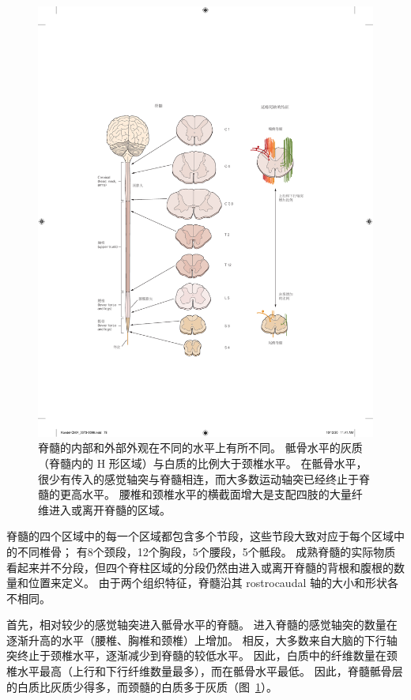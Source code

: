 \begin{figure}[htbp]
	\centering
	\includegraphics[width=1.0\linewidth]{chap04/fig_4_4}
	\caption{脊髓的内部和外部外观在不同的水平上有所不同。 
		骶骨水平的灰质（脊髓内的 H 形区域）与白质的比例大于颈椎水平。 
		在骶骨水平，很少有传入的感觉轴突与脊髓相连，而大多数运动轴突已经终止于脊髓的更高水平。 
		腰椎和颈椎水平的横截面增大是支配四肢的大量纤维进入或离开脊髓的区域。}
	\label{fig:4_4}
\end{figure}


脊髓的四个区域中的每一个区域都包含多个节段，这些节段大致对应于每个区域中的不同椎骨； 有8个颈段，12个胸段，5个腰段，5个骶段。
成熟脊髓的实际物质看起来并不分段，但四个脊柱区域的分段仍然由进入或离开脊髓的背根和腹根的数量和位置来定义。
由于两个组织特征，脊髓沿其 rostrocaudal 轴的大小和形状各不相同。


首先，相对较少的感觉轴突进入骶骨水平的脊髓。
进入脊髓的感觉轴突的数量在逐渐升高的水平（腰椎、胸椎和颈椎）上增加。
相反，大多数来自大脑的下行轴突终止于颈椎水平，逐渐减少到脊髓的较低水平。
因此，白质中的纤维数量在颈椎水平最高（上行和下行纤维数量最多），而在骶骨水平最低。
因此，脊髓骶骨层的白质比灰质少得多，而颈髓的白质多于灰质（图~\ref{fig:4_4}）。


